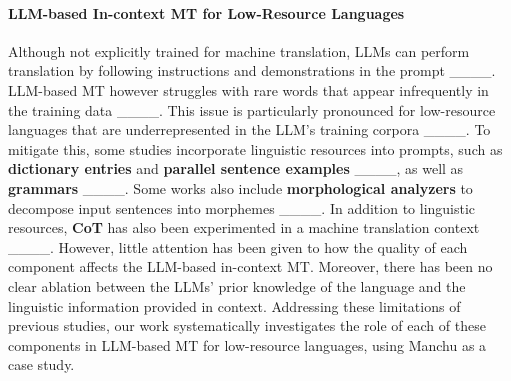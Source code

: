\paragraph{LLM-based In-context MT for Low-Resource Languages}
Although not explicitly trained for machine translation, LLMs can perform translation by following instructions and demonstrations in the prompt ____. LLM-based MT however struggles with rare words that appear infrequently in the training data ____. This issue is particularly pronounced for low-resource languages that are underrepresented in the LLM's training corpora ____.
To mitigate this, some studies incorporate linguistic resources into prompts, such as \textbf{dictionary entries} and \textbf{parallel sentence examples} ____, as well as \textbf{grammars} ____. Some works also include \textbf{morphological analyzers} to decompose input sentences into morphemes ____.
In addition to linguistic resources, \textbf{CoT}  has also been experimented in a machine translation context ____. 
However, little attention has been given to how the quality of each component affects the LLM-based in-context MT. Moreover, there has been no clear ablation between the LLMs' prior knowledge of the language and the linguistic information provided in context.
Addressing these limitations of previous studies, our work systematically investigates the role of each of these components in LLM-based MT for low-resource languages, using Manchu as a case study.

